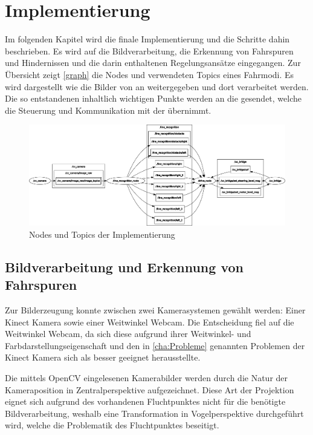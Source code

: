 \section{Implementierung}
\label{cha:Implementierung}
Im folgenden Kapitel wird die finale Implementierung und die Schritte dahin beschrieben. Es wird auf die Bildverarbeitung, die Erkennung von Fahrspuren und Hindernissen und die darin enthaltenen Regelungsansätze eingegangen.
Zur Übersicht zeigt \autoref{graph} die Nodes und verwendeten Topics eines Fahrmodi. Es wird dargestellt wie die Bilder von  an  weitergegeben und dort verarbeitet werden. Die so entstandenen inhaltlich wichtigen Punkte werden an die  gesendet, welche die Steuerung und Kommunikation mit der  übernimmt. 
\begin{figure}[ht]
	\centering
	\includegraphics[width=\textwidth]{images/rosgraph.png}
	\caption{Nodes und Topics der Implementierung}
\end{figure}
\label{graph}
\subsection{Bildverarbeitung und Erkennung von Fahrspuren}
\label{sec:spurerkennung}
Zur Bilderzeugung konnte zwischen zwei Kamerasystemen gewählt werden: Einer Kinect Kamera sowie einer Weitwinkel Webcam. Die Entscheidung fiel auf die Weitwinkel Webcam, da sich diese aufgrund ihrer Weitwinkel- und Farbdarstellungseigenschaft und den in \autoref{cha:Probleme} genannten Problemen der Kinect Kamera sich als besser geeignet herausstellte. 

Die mittels OpenCV eingelesenen Kamerabilder werden durch die Natur der Kameraposition in Zentralperspektive aufgezeichnet. Diese Art der Projektion eignet sich aufgrund des vorhandenen Fluchtpunktes nicht für die benötigte Bildverarbeitung, weshalb eine Transformation in Vogelperspektive durchgeführt wird, welche die Problematik des Fluchtpunktes beseitigt.

